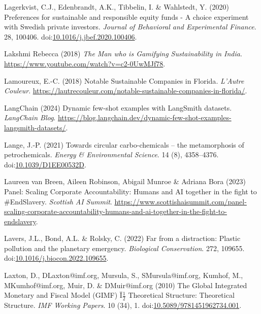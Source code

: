 \documentclass[
  letterpaper,
  DIV=11,
  numbers=noendperiod]{scrartcl}
\newlength{\cslhangindent}
\newenvironment{CSLReferences}[2] %
 {\begin{list}{}{%
  \setlength{\itemindent}{0pt}
  \setlength{\leftmargin}{0pt}
  \setlength{\parsep}{0pt}
  \ifodd #1
   \setlength{\leftmargin}{\cslhangindent}
   \setlength{\itemindent}{-1\cslhangindent}
  \fi
  \setlength{\itemsep}{#2\baselineskip}}}
 {\end{list}}
\begin{document}
\begin{CSLReferences}{0}{1}
Lagerkvist, C.J., Edenbrandt, A.K., Tibbelin, I. \& Wahlstedt, Y. (2020)
Preferences for sustainable and responsible equity funds - {A} choice
experiment with {Swedish} private investors. \emph{Journal of Behavioral
and Experimental Finance}. 28, 100406.
doi:\href{https://doi.org/10.1016/j.jbef.2020.100406}{10.1016/j.jbef.2020.100406}.

Lakshmi Rebecca (2018) \emph{The {Man} who is {Gamifying Sustainability}
in {India}}. \url{https://www.youtube.com/watch?v=c2-0UwMJf78}.

Lamoureux, E.-C. (2018) Notable {Sustainable Companies} in {Florida}.
\emph{L'Autre Couleur}.
\url{https://lautrecouleur.com/notable-sustainable-companies-in-florida/}.

LangChain (2024) Dynamic few-shot examples with {LangSmith} datasets.
\emph{LangChain Blog}.
\url{https://blog.langchain.dev/dynamic-few-shot-examples-langsmith-datasets/}.

Lange, J.-P. (2021) Towards circular carbo-chemicals -- the
metamorphosis of petrochemicals. \emph{Energy \& Environmental Science}.
14 (8), 4358--4376.
doi:\href{https://doi.org/10.1039/D1EE00532D}{10.1039/D1EE00532D}.

Laureen van Breen, Aileen Robinson, Abigail Munroe \& Adriana Bora
(2023) Panel: {Scaling Corporate Accountability}: {Humans} and {AI}
together in the fight to \#{EndSlavery}. \emph{Scottish AI Summit}.
\url{https://www.scottishaisummit.com/panel-scaling-corporate-accountability-humans-and-ai-together-in-the-fight-to-endslavery}.

Lavers, J.L., Bond, A.L. \& Rolsky, C. (2022) Far from a distraction:
{Plastic} pollution and the planetary emergency. \emph{Biological
Conservation}. 272, 109655.
doi:\href{https://doi.org/10.1016/j.biocon.2022.109655}{10.1016/j.biocon.2022.109655}.

Laxton, D., DLaxton@imf.org, Mursula, S., SMursula@imf.org, Kumhof, M.,
MKumhof@imf.org, Muir, D. \& DMuir@imf.org (2010) The {Global Integrated
Monetary} and {Fiscal Model} ({GIMF})
{Ï}{\textquestiondown}{\(\frac{1}{2}\)} {Theoretical Structure}:
{Theoretical Structure}. \emph{IMF Working Papers}. 10 (34), 1.
doi:\href{https://doi.org/10.5089/9781451962734.001}{10.5089/9781451962734.001}.


\end{CSLReferences}
\end{document}
